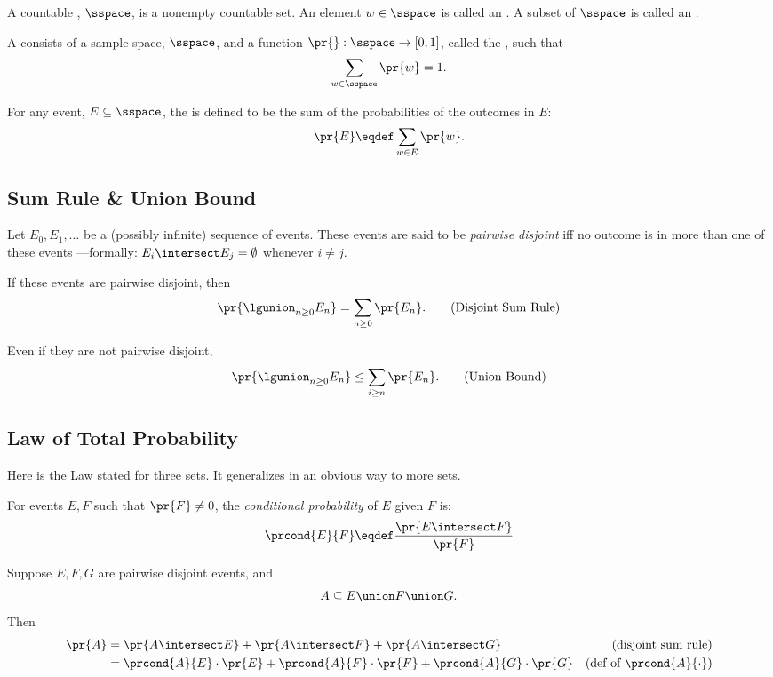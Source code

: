 \documentclass[handout]{mcs}
\begin{document}
  A countable , $\sspace$, is a nonempty countable set.
  An element $w \in \sspace$ is called an .  A subset of
  $\sspace$ is called an .

  A  consists of a sample
  space, $\sspace$, and a function $\pr{}: \sspace\to [0,1]$, called
  the , such that
\[
\sum_{w \in \sspace} \pr{w} = 1.
\]

For any event, $E \subseteq \sspace$, the  is
defined to be the sum of the probabilities of the outcomes in $E$:
\[
\pr{E} \eqdef \sum_{w \in E} \pr{w}.
\]


\subsection{Sum Rule \& Union Bound}

Let $E_0,E_1,\dots$ be a (possibly infinite) sequence of events.  These
events are said to be \emph{pairwise disjoint} iff no outcome is in more
than one of these events ---formally: $E_i \intersect E_j = \emptyset$
whenever $i \neq j$.

If these events are pairwise disjoint, then
\begin{equation}
\pr{\lgunion_{n \geq 0} E_n} = \sum_{n \geq 0} \pr{E_n}.\tag{Disjoint Sum Rule}
\end{equation}

Even if they are not pairwise disjoint,
\begin{equation}
\pr{\lgunion_{n \geq 0} E_n} \leq \sum_{i \geq n} \pr{E_n}.\tag{Union Bound}
\end{equation}

\subsection{Law of Total Probability}

Here is the Law stated for three sets.  It generalizes in an obvious way
to more sets.

\begin{rul*}

  For events $E,F$ such that $\pr{F} \neq 0$, the \emph{conditional
    probability} of $E$ given $F$ is:
\[
\prcond{E}{F} \eqdef \frac{\pr{E \intersect F}}{\pr{F}}
\]

Suppose $E,F,G$ are pairwise disjoint events, and
\[
A \subseteq E \union F \union G. 
\]
Then
\begin{align*}
\pr{A} & = \pr{A \intersect E}+ 
           \pr{A \intersect F}+ 
           \pr{A \intersect G} & \textrm{(disjoint sum rule)}\\
 & = \prcond{A}{E} \cdot \pr{E} +
         \prcond{A}{F} \cdot \pr{F} +
         \prcond{A}{G} \cdot \pr{G} & \textrm{(def of $\prcond{A}{\cdot}$)}
\end{align*}
\end{rul*}
\end{document}
